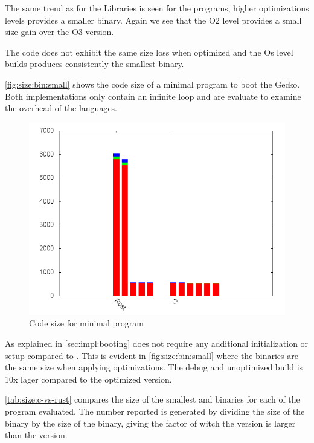 The same trend as for the Libraries is seen for the {\rust} programs, higher optimizations levels provides a smaller binary.
Again we see that the O2 level provides a small size gain over the O3 version.

The {\C} code does not exhibit the same size loss when optimized and the Os level builds produces consistently the smallest binary.

\autoref{fig:size:bin:small} shows the code size of a minimal program to boot the Gecko.
Both implementations only contain an infinite loop and are evaluate to examine the overhead of the languages.

\begin{figure}[H]
  \begin{center}
    \includegraphics[scale=0.5]{results/plots/size/bin/small/size.png}
  \end{center}
  \caption{Code size for minimal program}
  \label{fig:size:bin:small}
\end{figure}

As explained in \autoref{sec:impl:booting} {\rust} does not require any additional initialization or setup compared to {\C}.
This is evident in \autoref{fig:size:bin:small} where the binaries are the same size when applying optimizations.
The debug and unoptimized {\rust} build is 10x lager compared to the optimized version.

\autoref{tab:size:c-vs-rust} compares the size of the smallest {\C} and {\rust} binaries for each of the program evaluated.
The number reported is generated by dividing the size of the {\rust} binary by the size of the {\C} binary, giving the factor of witch the {\rust} version is larger than the {\C} version.

